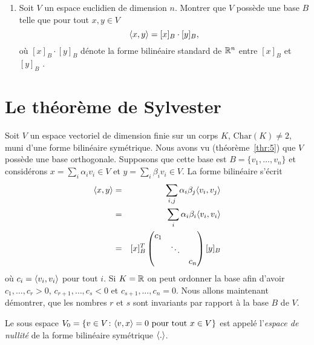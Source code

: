 \begin{enumerate}
\item Soit $V$ un espace euclidien de dimension $n$. Montrer que $V$ possède une base $B$ telle que pour tout $x,y \in V$
  \begin{displaymath}
    \langle {x,y} \rangle = [x]_B \cdot [y]_B, 
  \end{displaymath}
où $ [x]_B \cdot [y]_B$  dénote la forme bilinéaire standard de $\mathbb{R}^n$ entre $[x]_B$ et $ [y]_B$ .  

\end{enumerate}




\section{Le théorème de Sylvester}
\label{sec:le-theoreme-de}


Soit $V$ un espace vectoriel de dimension finie sur un corps $K$, $\mathrm{Char}(K) \neq 2$, muni d'une forme bilinéaire symétrique. Nous avons vu (théorème~\ref{thr:5}) que $V$ possède une base orthogonale. Supposons que cette base est $B = \{v_1,\dots,v_n\}$ et considérons $x = \sum_i \alpha_i v_i \in V$ et $y = \sum_i \beta_i v_i \in V$. La forme bilinéaire  s'écrit 
\begin{eqnarray*}
  \langle {x,y} \rangle & =  & \sum_{i, j} \alpha_i \beta_j \langle {v_i,v_j} \rangle \\
              & = & \sum_i \alpha_i \beta_i \langle {v_i,v_i} \rangle \\
               & = & [x]_B^T 
                    \begin{pmatrix}
                      c_1 & & \\
                                     & \ddots & \\
                                     & & c_n
                    \end{pmatrix} [y]_B
\end{eqnarray*}
où $c_i = \langle {v_i,v_i} \rangle$ pour tout $i$. 
Si $K = \mathbb{R}$ on peut ordonner la base afin d'avoir $c_1,\dots,c_r>0$, $c_{r+1},\dots,c_s < 0$ et $c_{s+1},\dots,c_n = 0$. Nous allons maintenant démontrer, que les nombres $r$ et $s$ sont invariants par rapport à la base $B$ de $V$. 


\begin{definition}
  \label{def:11}
  Le sous espace $V_0 = \{v \in V \colon \langle {v,x} \rangle = 0 \text{ pour tout } x \in V\}$ est appelé l'\emph{espace de nullité} de la forme bilinéaire symétrique $\langle {.} \rangle$. 
\end{definition}

